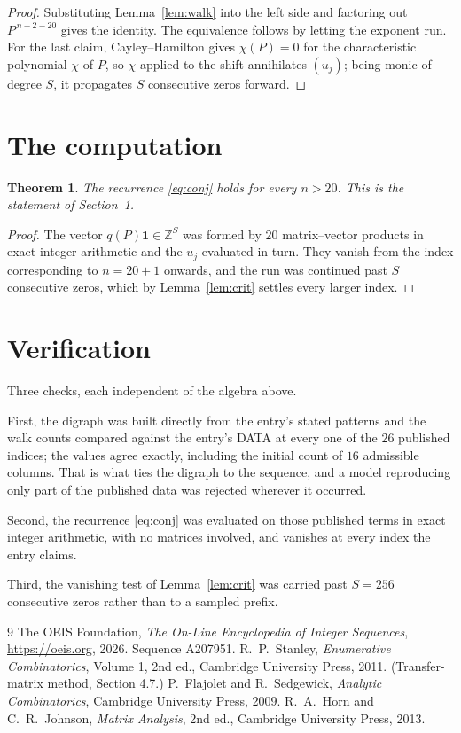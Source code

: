\documentclass[11pt,a4paper]{article}
\theoremstyle{plain}
\newtheorem{theorem}{Theorem}
\theoremstyle{definition}
\begin{document}
\begin{proof}
Substituting Lemma~\ref{lem:walk} into the left side and factoring out
$P^{\,n-2-20}$ gives the identity. The equivalence follows by letting the exponent
run. For the last claim, Cayley--Hamilton gives $\chi(P)=0$ for the characteristic
polynomial $\chi$ of $P$, so $\chi$ applied to the shift annihilates $(u_j)$; being monic of
degree $S$, it propagates $S$ consecutive zeros forward.
\end{proof}

\section{The computation}

\begin{theorem}
The recurrence \eqref{eq:conj} holds for every $n>20$. This is the statement of
Section~1.
\end{theorem}

\begin{proof}
The vector $q(P)\mathbf{1}\in\mathbb{Z}^{S}$ was formed by $20$ matrix--vector
products in exact integer arithmetic and the $u_j$ evaluated in turn. They vanish from the
index corresponding to $n=20+1$ onwards, and the run was continued past $S$ consecutive
zeros, which by Lemma~\ref{lem:crit} settles every larger index.
\end{proof}

\section{Verification}

Three checks, each independent of the algebra above.

First, the digraph was built directly from the entry's stated patterns and the walk counts
compared against the entry's DATA at every one of the $26$ published indices; the
values agree exactly, including the initial count of $16$ admissible columns. That is
what ties the digraph to the sequence, and a model reproducing only part of the published
data was rejected wherever it occurred.

Second, the recurrence \eqref{eq:conj} was evaluated on those published terms in exact
integer arithmetic, with no matrices involved, and vanishes at every index the entry claims.

Third, the vanishing test of Lemma~\ref{lem:crit} was carried past $S=256$ consecutive
zeros rather than to a sampled prefix.

\begin{thebibliography}{9}
 The OEIS Foundation, \emph{The On-Line Encyclopedia of Integer
Sequences}, \url{https://oeis.org}, 2026. Sequence A207951.
 R.~P.~Stanley, \emph{Enumerative Combinatorics}, Volume 1, 2nd ed.,
Cambridge University Press, 2011. (Transfer-matrix method, Section 4.7.)
 P.~Flajolet and R.~Sedgewick, \emph{Analytic Combinatorics}, Cambridge
University Press, 2009.
 R.~A.~Horn and C.~R.~Johnson, \emph{Matrix Analysis}, 2nd ed., Cambridge
University Press, 2013.
\end{thebibliography}
\end{document}
